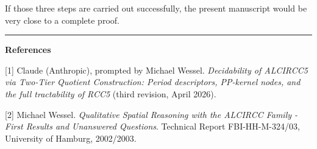 \documentclass[11pt]{article}
\begin{document}
If those three steps are carried out successfully, the present manuscript would be very close to a complete proof.

\vspace{1em}
\textcolor{Rule}{\rule{\linewidth}{0.8pt}}

\small
\textbf{References}

[1] Claude (Anthropic), prompted by Michael Wessel. \emph{Decidability of ALCIRCC5 via Two-Tier Quotient Construction: Period descriptors, PP-kernel nodes, and the full tractability of RCC5} (third revision, April 2026).

[2] Michael Wessel. \emph{Qualitative Spatial Reasoning with the ALCIRCC Family - First Results and Unanswered Questions}. Technical Report FBI-HH-M-324/03, University of Hamburg, 2002/2003.
\end{document}
